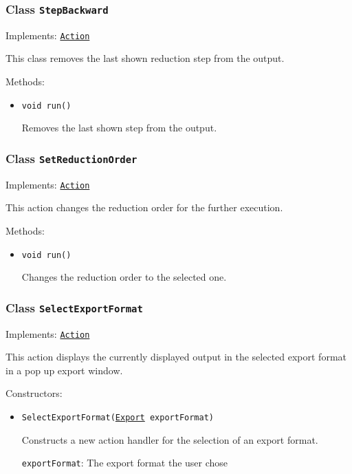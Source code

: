 \subsubsection{Class \texttt{StepBackward}}
\label{type:edu.kit.wavelength.client.view.action.StepBackward}
Implements: \texttt{\hyperref[type:edu.kit.wavelength.client.view.action.Action]{Action}}

This class removes the last shown reduction step from the output.

Methods:
\begin{itemize}
\item \texttt{void run()}

Removes the last shown step from the output.

\end{itemize}

\subsubsection{Class \texttt{SetReductionOrder}}
\label{type:edu.kit.wavelength.client.view.action.SetReductionOrder}
Implements: \texttt{\hyperref[type:edu.kit.wavelength.client.view.action.Action]{Action}}

This action changes the reduction order for the further execution.

Methods:
\begin{itemize}
\item \texttt{void run()}

Changes the reduction order to the selected one.

\end{itemize}

\subsubsection{Class \texttt{SelectExportFormat}}
\label{type:edu.kit.wavelength.client.view.action.SelectExportFormat}
Implements: \texttt{\hyperref[type:edu.kit.wavelength.client.view.action.Action]{Action}}

This action displays the currently displayed output in the selected export
 format in a pop up export window.

Constructors:
\begin{itemize}
\item \texttt{SelectExportFormat(\hyperref[type:edu.kit.wavelength.client.view.export.Export]{Export} exportFormat)}

Constructs a new action handler for the selection of an export format.

\texttt{exportFormat}: The export format the user chose

\end{itemize}

